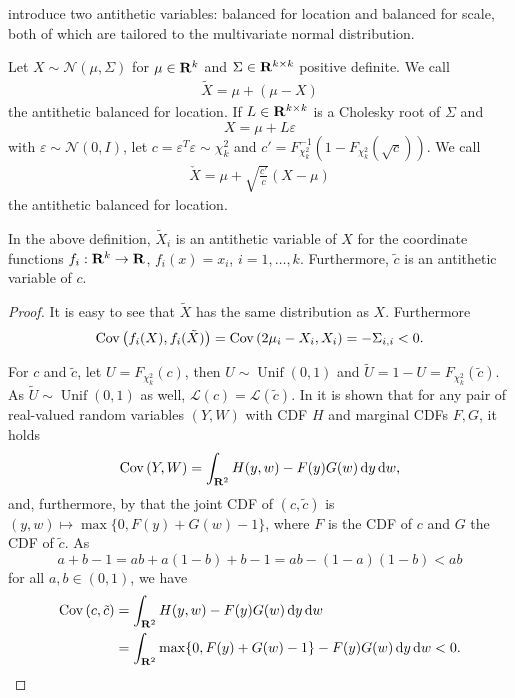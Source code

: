 \citep{Durbin1997Monte} introduce two antithetic variables: balanced for location and balanced for scale, both of which are tailored to the multivariate normal distribution. 
\begin{definition}
    Let $X\sim \mathcal N(\mu, \Sigma)$ for $\mu \in \mathbf R^{k}$ and $\Sigma \in \mathbf R^{k\times k}$ positive definite. We call
    \begin{align}
        \label{eq:antithetic-location}
    \tilde X = \mu + (\mu - X)
    \end{align}
    the antithetic balanced for location. If $L\in\mathbf R^{k\times k}$ is a Cholesky root of $\Sigma$ and 
    $$
        X = \mu + L \varepsilon
    $$
    with $\varepsilon \sim \mathcal N(0, I)$, let $c = \varepsilon^{T}\varepsilon \sim \chi^{2}_k$ and $c' = F^{-1}_{\chi^{2}_{k}}(1 - F_{\chi^{2}_k}(\sqrt{c}))$. We call
    \begin{align}
        \label{eq:antithetic-scale}
        \check X = \mu + \sqrt{\frac{c'}{c}} \left( X - \mu \right)
    \end{align}
    the antithetic balanced for location.
\end{definition}
\begin{lemma}
    In the above definition, $\tilde X_{i}$ is an antithetic variable of $X$ for the coordinate functions $f_{i}:\mathbf R^{k} \to \mathbf R$, $f_{i}(x) = x_{i}$, $i = 1, \dots, k$.
    Furthermore, $\tilde c$ is an antithetic variable of $c$.
\end{lemma}
\begin{proof}
    It is easy to see that $\tilde X$ has the same distribution as $X$. Furthermore 
    $$
        \operatorname{Cov} \left( f_{i}(X), f_{i}(\tilde X)\right) = \operatorname{Cov} \left( 2 \mu_{i} - X_{i}, X_{i} \right) = - \Sigma_{i,i} < 0.
    $$

    For $c$ and $\tilde c$, let $U = F_{\chi^{2}_{k}}(c)$, then $U \sim \operatorname{Unif}(0,1)$ and $\tilde U = 1 - U = F_{\chi^{2}_k}(\tilde c)$. 
    As $\tilde U \sim \operatorname{Unif}(0, 1)$ as well, $\mathcal L (c) = \mathcal L (\tilde c)$.
    In \citep[Lemma 2.3]{Whitt1976Bivariate} it is shown that for any pair of real-valued random variables $(Y,W)$ with CDF $H$ and marginal CDFs $F, G$, it holds
    $$
        \operatorname{Cov} \left(Y,W \right) = \int_{\mathbf R^{2}} H(y,w) - F(y)G(w) \,\mathrm d y \,\mathrm d w,
    $$
    and, furthermore, by \citep[Theorem 2.1 and Lemma 2.4]{Whitt1976Bivariate} that the joint CDF of $(c, \tilde c)$ is $(y,w) \mapsto \max \{0, F(y) + G(w) - 1\}$, where $F$ is the CDF of $c$ and $G$ the CDF of $\tilde c$. 
    As 
    $$
        a + b - 1 = ab + a(1-b) + b - 1 = ab - (1 - a)(1 - b) < ab
    $$
    for all $a,b \in (0,1)$, we have 
    \begin{align*}
        \operatorname{Cov} \left( c, \tilde c \right) &= \int_{\mathbf R^{2}} H(y,w) - F(y)G(w) \,\mathrm d y \,\mathrm d w \\
        &= \int_{\mathbf R^{2}} \max\{0, F(y) + G(w) - 1\} - F(y)G(w) \,\mathrm d y \,\mathrm d w < 0.
    \end{align*}
\end{proof}
